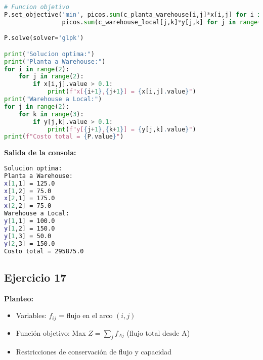\documentclass[12pt]{article}
\begin{document}
\begin{lstlisting}[language=Python]
# Funcion objetivo
P.set_objective('min', picos.sum(c_planta_warehouse[i,j]*x[i,j] for i in range(2) for j in range(2)) +
                picos.sum(c_warehouse_local[j,k]*y[j,k] for j in range(2) for k in range(3)))

P.solve(solver='glpk')

print("Solucion optima:")
print("Planta a Warehouse:")
for i in range(2):
    for j in range(2):
        if x[i,j].value > 0.1:
            print(f"x[{i+1},{j+1}] = {x[i,j].value}")
print("Warehouse a Local:")
for j in range(2):
    for k in range(3):
        if y[j,k].value > 0.1:
            print(f"y[{j+1},{k+1}] = {y[j,k].value}")
print(f"Costo total = {P.value}")
\end{lstlisting}

\textbf{Salida de la consola:}
\begin{lstlisting}[language=bash,backgroundcolor=\color{black},basicstyle=\color{white}\ttfamily,numbers=none]
Solucion optima:
Planta a Warehouse:
x[1,1] = 125.0
x[1,2] = 75.0
x[2,1] = 175.0
x[2,2] = 75.0
Warehouse a Local:
y[1,1] = 100.0
y[1,2] = 150.0
y[1,3] = 50.0
y[2,3] = 150.0
Costo total = 295875.0
\end{lstlisting}

\subsection*{Ejercicio 17}

\textbf{Planteo:}
\begin{itemize}
\item Variables: $f_{ij}$ = flujo en el arco $(i,j)$
\item Función objetivo: Max $Z = \sum_{j} f_{Aj}$ (flujo total desde A)
\item Restricciones de conservación de flujo y capacidad
\end{itemize}
\end{document}

